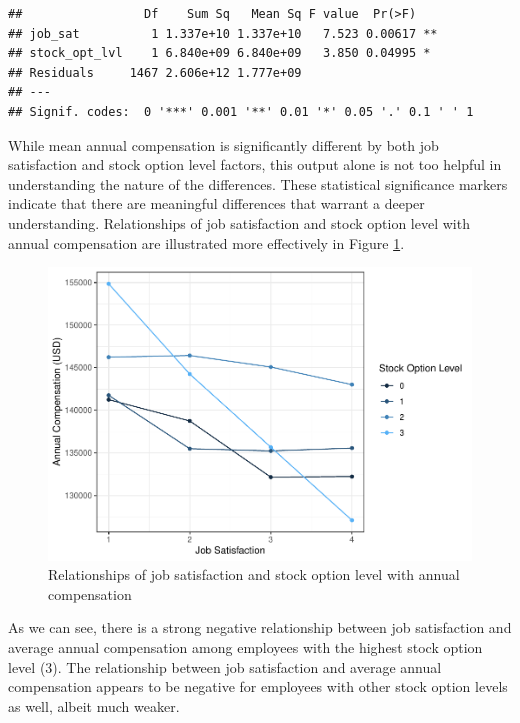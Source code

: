\documentclass[
]{book}
\begin{document}
\begin{verbatim}
##                 Df    Sum Sq   Mean Sq F value  Pr(>F)   
## job_sat          1 1.337e+10 1.337e+10   7.523 0.00617 **
## stock_opt_lvl    1 6.840e+09 6.840e+09   3.850 0.04995 * 
## Residuals     1467 2.606e+12 1.777e+09                   
## ---
## Signif. codes:  0 '***' 0.001 '**' 0.01 '*' 0.05 '.' 0.1 ' ' 1
\end{verbatim}

While mean annual compensation is significantly different by both job satisfaction and stock option level factors, this output alone is not too helpful in understanding the nature of the differences. These statistical significance markers indicate that there are meaningful differences that warrant a deeper understanding. Relationships of job satisfaction and stock option level with annual compensation are illustrated more effectively in Figure \ref{fig:two-way-factorial}.

\begin{figure}

{\centering \includegraphics[width=1\linewidth]{The_Fundamentals_of_People_Analytics_files/figure-latex/two-way-factorial-1} 

}

\caption{Relationships of job satisfaction and stock option level with annual compensation}\label{fig:two-way-factorial}
\end{figure}

As we can see, there is a strong negative relationship between job satisfaction and average annual compensation among employees with the highest stock option level (3). The relationship between job satisfaction and average annual compensation appears to be negative for employees with other stock option levels as well, albeit much weaker.
\end{document}
